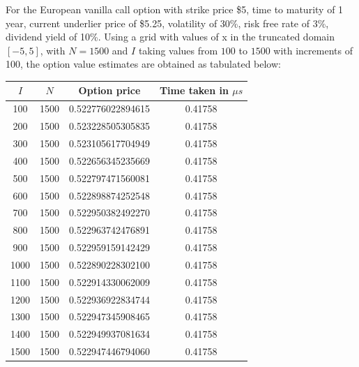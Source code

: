 For the European vanilla call option with strike price \$5, time to maturity of 1 year, current underlier price of \$5.25, volatility of 30\%, risk free rate of 3\%, dividend yield of 10\%. Using a grid with values of x in the truncated domain $[-5, 5]$, with $N = 1500$ and $I$ taking values from $100$ to $1500$ with increments of 100, the option value estimates are obtained as tabulated below:
\begin{center}
	\begin{tabular}{| c | c | c | c |}
		\hline $I$ & $N$ & Option price & Time taken in $\mu s$\\
		[0.5ex]
		\hline 100 & 1500 & 0.522776022894615& 0.41758 \\
		\hline 200 & 1500 & 0.523228505305835& 0.41758 \\
		\hline 300 & 1500 & 0.523105617704949& 0.41758 \\
		\hline 400 & 1500 & 0.522656345235669& 0.41758 \\
		\hline 500 & 1500 & 0.522797471560081& 0.41758 \\
		\hline 600 & 1500 & 0.522898874252548& 0.41758 \\
		\hline 700 & 1500 & 0.522950382492270& 0.41758 \\
		\hline 800 & 1500 & 0.522963742476891& 0.41758 \\
		\hline 900 & 1500 & 0.522959159142429& 0.41758 \\
		\hline 1000 & 1500 &0.522890228302100 & 0.41758 \\
		\hline 1100 & 1500 &0.522914330062009 & 0.41758 \\
		\hline 1200 & 1500 &0.522936922834744 & 0.41758 \\
		\hline 1300 & 1500 &0.522947345908465 & 0.41758 \\
		\hline 1400 & 1500 &0.522949937081634 & 0.41758 \\
		\hline 1500 & 1500 &0.522947446794060 & 0.41758 \\
		\hline
	\end{tabular}
\end{center}

